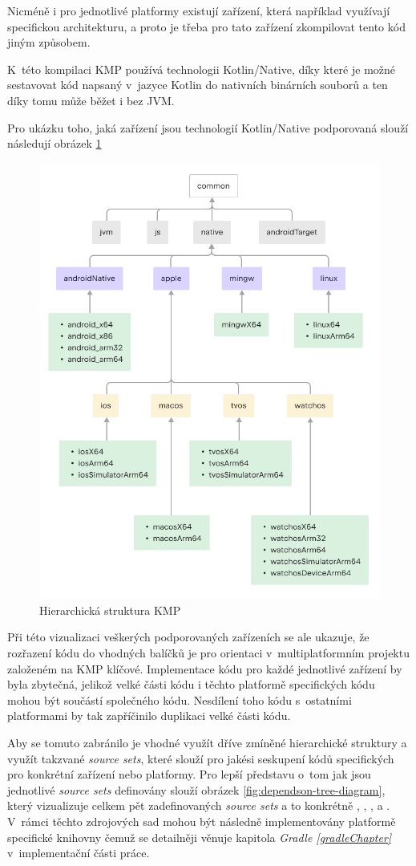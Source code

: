 Nicméně i pro jednotlivé platformy existují zařízení, která například využívají specifickou architekturu, a proto je třeba pro 
tato zařízení zkompilovat tento kód jiným způsobem.

K~této kompilaci KMP používá technologii Kotlin/Native, díky které
je možné sestavovat kód napsaný v~jazyce Kotlin do nativních binárních souborů a ten díky tomu může běžet i bez JVM. \cite{kotlinNative}

Pro ukázku toho, jaká zařízení jsou technologií Kotlin/Native podporovaná slouží následují obrázek \ref{fig:KMP_struktura}

\begin{figure}[H]
  \centering
  \includegraphics[width=.7\textwidth]{full-template-hierarchy.png}
  \caption{Hierarchická struktura KMP \cite{KMPHierarchi}}
  \label{fig:KMP_struktura}
\end{figure}

Při této vizualizaci veškerých podporovaných zařízeních se ale ukazuje, že rozřazení kódu do vhodných balíčků je pro orientaci
v~multiplatformním projektu založeném na KMP klíčové. Implementace kódu pro každé jednotlivé zařízení by byla zbytečná, jelikož
velké části kódu i těchto platformě specifických kódu mohou být součástí společného kódu. Nesdílení toho kódu s~ostatními platformami
by tak zapříčinilo duplikaci velké části kódu. 

Aby se tomuto zabránilo je vhodné využít dříve zmíněné hierarchické struktury a využít takzvané \textit{source sets}, které slouží 
pro jakési seskupení kódů specifických pro konkrétní zařízení nebo platformy. Pro lepší představu o~tom jak jsou jednotlivé
\textit{source sets} definovány slouží obrázek \ref{fig:dependson-tree-diagram},
který vizualizuje celkem pět zadefinovaných \textit{source sets} a to konkrétně , , 
,  a . V~rámci těchto zdrojových sad mohou být následně implementovány
platformě specifické knihovny čemuž se detailněji věnuje kapitola \textit{Gradle \ref{gradleChapter}} v~implementační části práce.

